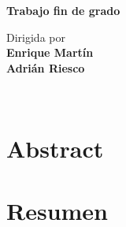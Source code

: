 \documentclass[11pt,a4paper]{article}
\begin{document}
\begin{frontmatter}
\vfill

\begin{center}
  {\Large \textbf{Trabajo fin de grado}}
\end{center}

\vfill

\begin{large}
\begin{center}
{Dirigida por}  \\ [0.3em]
\textbf{Enrique Martín}\\[0.3em]
\textbf{Adrián Riesco}
\begin{large}
\begin{center}
\vspace{3ex}
\end{center}
\end{large}
\end{center}

\vfill

\end{large}

\newpage

\thispagestyle{empty}
\mbox{ }

\clearpage


%


\end{frontmatter}

%

\section*{Abstract}


\newpage

\section*{Resumen}


\newpage
\end{document}
